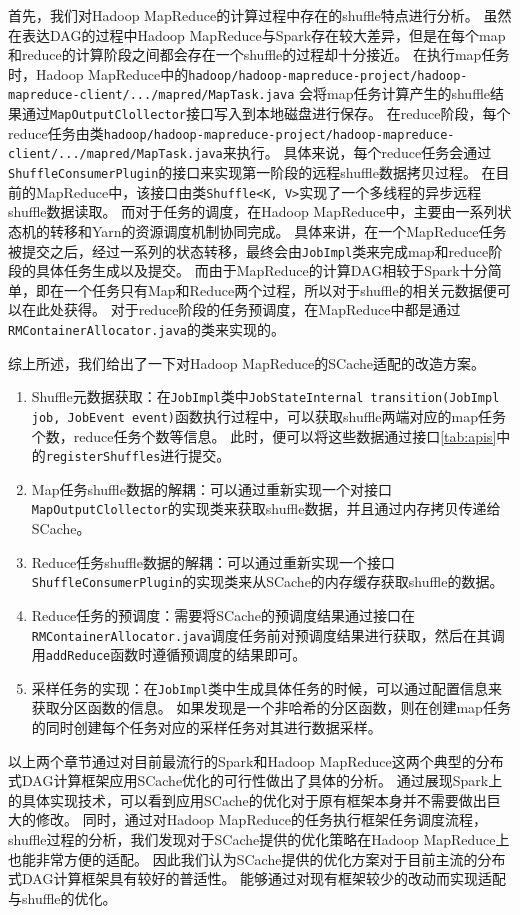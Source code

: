 首先，我们对Hadoop MapReduce的计算过程中存在的shuffle特点进行分析。
虽然在表达DAG的过程中Hadoop MapReduce与Spark存在较大差异，但是在每个map和reduce的计算阶段之间都会存在一个shuffle的过程却十分接近。
在执行map任务时，Hadoop MapReduce中的\verb|hadoop/hadoop-mapreduce-project/hadoop-mapreduce-client/.../mapred/MapTask.java|
会将map任务计算产生的shuffle结果通过\verb|MapOutputClollector|接口写入到本地磁盘进行保存。
在reduce阶段，每个reduce任务由类\verb|hadoop/hadoop-mapreduce-project/hadoop-mapreduce-client/.../mapred/MapTask.java|来执行。
具体来说，每个reduce任务会通过\verb|ShuffleConsumerPlugin|的接口来实现第一阶段的远程shuffle数据拷贝过程。
在目前的MapReduce中，该接口由类\verb|Shuffle<K, V>|实现了一个多线程的异步远程shuffle数据读取。
而对于任务的调度，在Hadoop MapReduce中，主要由一系列状态机的转移和Yarn的资源调度机制协同完成。
具体来讲，在一个MapReduce任务被提交之后，经过一系列的状态转移，最终会由\verb|JobImpl|类来完成map和reduce阶段的具体任务生成以及提交。
而由于MapReduce的计算DAG相较于Spark十分简单，即在一个任务只有Map和Reduce两个过程，所以对于shuffle的相关元数据便可以在此处获得。
对于reduce阶段的任务预调度，在MapReduce中都是通过\verb|RMContainerAllocator.java|的类来实现的。

综上所述，我们给出了一下对Hadoop MapReduce的SCache适配的改造方案。
\begin{enumerate}
    \item Shuffle元数据获取：在\verb|JobImpl|类中\verb|JobStateInternal transition(JobImpl job, JobEvent event)|函数执行过程中，可以获取shuffle两端对应的map任务个数，reduce任务个数等信息。
    此时，便可以将这些数据通过接口\ref{tab:apis}中的\verb|registerShuffles|进行提交。
    \item Map任务shuffle数据的解耦：可以通过重新实现一个对接口\verb|MapOutputClollector|的实现类来获取shuffle数据，并且通过内存拷贝传递给SCache。
    \item Reduce任务shuffle数据的解耦：可以通过重新实现一个接口\verb|ShuffleConsumerPlugin|的实现类来从SCache的内存缓存获取shuffle的数据。
    \item Reduce任务的预调度：需要将SCache的预调度结果通过接口在\verb|RMContainerAllocator.java|调度任务前对预调度结果进行获取，然后在其调用\verb|addReduce|函数时遵循预调度的结果即可。
    \item 采样任务的实现：在\verb|JobImpl|类中生成具体任务的时候，可以通过配置信息来获取分区函数的信息。
    如果发现是一个非哈希的分区函数，则在创建map任务的同时创建每个任务对应的采样任务对其进行数据采样。
\end{enumerate}

以上两个章节通过对目前最流行的Spark和Hadoop MapReduce这两个典型的分布式DAG计算框架应用SCache优化的可行性做出了具体的分析。
通过展现Spark上的具体实现技术，可以看到应用SCache的优化对于原有框架本身并不需要做出巨大的修改。
同时，通过对Hadoop MapReduce的任务执行框架任务调度流程，shuffle过程的分析，我们发现对于SCache提供的优化策略在Hadoop MapReduce上也能非常方便的适配。
因此我们认为SCache提供的优化方案对于目前主流的分布式DAG计算框架具有较好的普适性。
能够通过对现有框架较少的改动而实现适配与shuffle的优化。